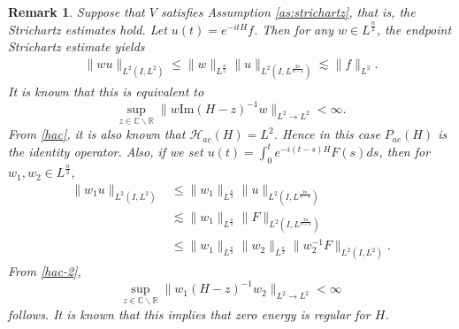 \documentclass[11pt,a4paper]{article}
\numberwithin{equation}{section}
\newtheorem{remark}{Remark}[section]
\begin{document}
\begin{remark}\label{remark:st:wave:as}
Suppose that $V$ satisfies Assumption \ref{as:strichartz}, that is, the Strichartz estimates hold. Let $u(t) = e^{-itH}f$. Then for any $w \in L^{\frac{n}{2}}$, the endpoint Strichartz estimate yields
\begin{align*}
\|wu\|_{L^{2}(I, L^{2})} \leq \|w\|_{L^{\frac{n}{2}}}\|u\|_{L^{2}(I,L^{\frac{2n}{n - 4}})}\lesssim \|f\|_{L^{2}}.
\end{align*}
It is known that this is equivalent to
\begin{equation}\label{hac}
\sup_{z \in \mathbb{C} \backslash \mathbb{R}}\|w\mathrm{Im}(H - z)^{-1}w\|_{L^{2}\rightarrow L^{2}} < \infty.
\end{equation}
From \eqref{hac}, it is also known that $\mathcal{H}_{ac}(H) = L^{2}$. Hence in this case $P_{ac}(H)$ is the identity operator. Also, if we set $u(t) = \int_{0}^{t}e^{-i(t-s)H}F(s) ds$, then for $w_{1},w_{2}\in L^{\frac{n}{2}}$,
\begin{equation}\label{hac-2}
\begin{aligned}
\|w_{1}u\|_{L^{2}(I, L^{2})} &\leq \|w_{1}\|_{L^{\frac{n}{2}}}\|u\|_{L^{2}(I, L^{\frac{2n}{n-4}})}\\
&\lesssim \|w_{1}\|_{L^{\frac{n}{2}}}\|F\|_{L^{2}(I, L^{\frac{2n}{n+4}})}\\ &\leq \|w_{1}\|_{L^{\frac{n}{2}}}\|w_{2}\|_{L^{\frac{n}{2}}}\|w_{2}^{-1}F\|_{L^{2}(I, L^{2})}.
\end{aligned}
\end{equation}
From \eqref{hac-2},
\begin{equation}
\sup_{z \in \mathbb{C} \backslash \mathbb{R}}\|w_{1}(H - z)^{-1}w_{2}\|_{L^{2}\rightarrow L^{2}} < \infty
\end{equation}
follows. It is known that this implies that zero energy is regular for $H$.
\end{remark}
\end{document}
